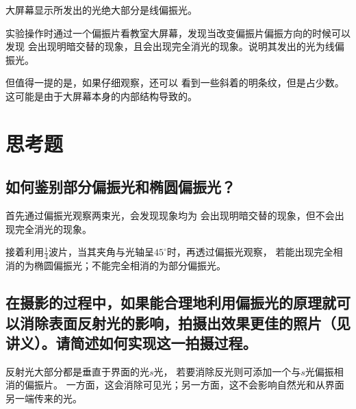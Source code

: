 \documentclass[a4paper,UTF8]{ctexart}
\begin{document}
大屏幕显示所发出的光绝大部分是线偏振光。

实验操作时通过一个偏振片看教室大屏幕，发现当改变偏振片偏振方向的时候可以发现
会出现明暗交替的现象，且会出现完全消光的现象。说明其发出的光为线偏振光。

但值得一提的是，如果仔细观察，还可以
看到一些斜着的明条纹，但是占少数。
这可能是由于大屏幕本身的内部结构导致的。

\section{思考题}

\subsection{如何鉴别部分偏振光和椭圆偏振光？}

首先通过偏振光观察两束光，会发现现象均为
会出现明暗交替的现象，但不会出现完全消光的现象。

接着利用$\frac{1}{4}$波片，当其夹角与光轴呈$45^\circ$时，再透过偏振光观察，
若能出现完全相消的为椭圆偏振光；不能完全相消的为部分偏振光。

\subsection{在摄影的过程中，如果能合理地利用偏振光的原理就可以消除表面反射光的影响，拍摄出效果更佳的照片（见
讲义）。请简述如何实现这一拍摄过程。}

反射光大部分都是垂直于界面的光$s$光，
若要消除反光则可添加一个与$s$光偏振相消的偏振片。
一方面，这会消除可见光；另一方面，这不会影响自然光和从界面另一端传来的光。
\end{document}
